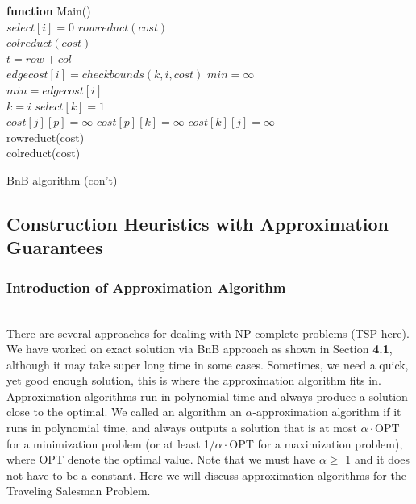 \begin{algorithm}
 \textbf{function} Main()\\
 {
 $select[i]=0$
 }
 $rowreduct(cost)$\\
 $colreduct(cost)$\\
 $t = row + col$\\
  {
  	{
     	{
         $edgecost[i]=checkbounds(k,i,cost)$
         }
     }
    $min=\infty$\\
   {
     {
         {
         $min=edgecost[i]$\\
         $k=i$
         }
     }
   }
  $select[k]=1$\\
  	{$cost[j][p]=\infty$
    }
  	{$cost[p][k]=\infty$}
  $cost[k][j]=\infty$\\
  rowreduct(cost)\\
  colreduct(cost)\\
  }
 
\caption{BnB algorithm (con't)}
\end{algorithm}




\subsection{Construction Heuristics with Approximation Guarantees}
\subsubsection{Introduction of Approximation Algorithm}
\hfill\\
There are several approaches for dealing with NP-complete problems (TSP here). We have worked on exact solution via BnB approach as shown in Section \textbf{4.1}, although it may take super long time in some cases. Sometimes, we need a quick, yet good enough solution, this is where the approximation algorithm fits in. Approximation algorithms run in polynomial time and always produce a solution close to the optimal. We called an algorithm an $\alpha$-approximation algorithm if it runs in polynomial time, and always outputs a solution that is at most $\alpha \cdot$OPT for a minimization problem (or at least 1/$\alpha \cdot$OPT for a maximization problem), where OPT denote the optimal value. Note that we must have $\alpha \geq$ 1 and it does not have to be a constant. Here we will discuss approximation algorithms for the Traveling Salesman Problem.\\

